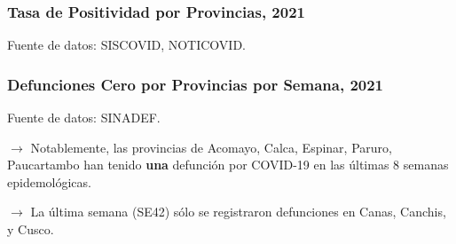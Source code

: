 \documentclass[xcolor=table]{beamer}
\begin{document}
	\begin{frame}
		\frametitle{Tasa de Positividad por Provincias, 2021}
		\vspace{-.5cm}
		
		\begin{table}[]
			\resizebox{\textwidth}{!}{%
				
			}
		\end{table}	
		{\tiny Fuente de datos: SISCOVID, NOTICOVID.}
		
	\end{frame}
	
	\begin{frame}
		\frametitle{Defunciones Cero por Provincias por Semana, 2021}
		\vspace{-.5cm}
		
		\begin{table}[]
			\resizebox{\textwidth}{!}{%
				
			}
		\end{table}	
		{\tiny Fuente de datos: SINADEF. \\}
				
		$\rightarrow$ Notablemente, las provincias de Acomayo, Calca, Espinar, Paruro, Paucartambo han tenido \textbf{\color{mycolor5}una} defunción por COVID-19 en las últimas 8 semanas epidemológicas.
		
		$\rightarrow$ La última semana (SE42) sólo se registraron defunciones en Canas, Canchis, y Cusco.
		
	\end{frame}
	
\end{document}
